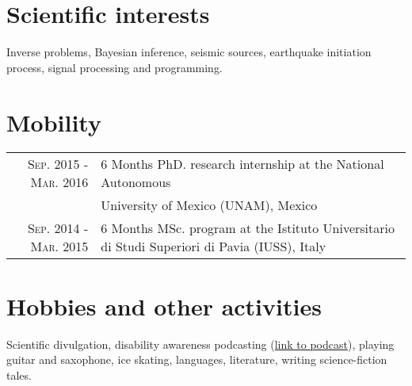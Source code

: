 \documentclass[a4paper,10.5pt]{article} %
\begin{document}
\vskip 0.2cm
\section{Scientific interests}

Inverse problems, Bayesian inference, seismic sources, earthquake initiation process, signal processing and programming.

\vskip 0.5cm
\section{Mobility}
\begin{tabular}{rp{11cm}}
{ \textsc{Sep. 2015 - Mar. 2016 }} & 6 Months PhD. research internship at the National Autonomous \\
				     & University of Mexico (UNAM), Mexico  \\
{ \textsc{Sep. 2014 - Mar. 2015 }} & 6 Months MSc. program at the Istituto Universitario di Studi Superiori di Pavia (IUSS), Italy  \\[0.6em] 
\end{tabular}


\vskip 0.2cm
\section{Hobbies and other activities}

Scientific divulgation, disability awareness podcasting (\href{https://podcasts.google.com/feed/aHR0cHM6Ly9hbmNob3IuZm0vcy8xZjQ3MjU0Yy9wb2RjYXN0L3Jzcw==}{link to podcast}),
playing guitar and saxophone, ice skating, languages, literature, writing science-fiction tales.
\end{document}
